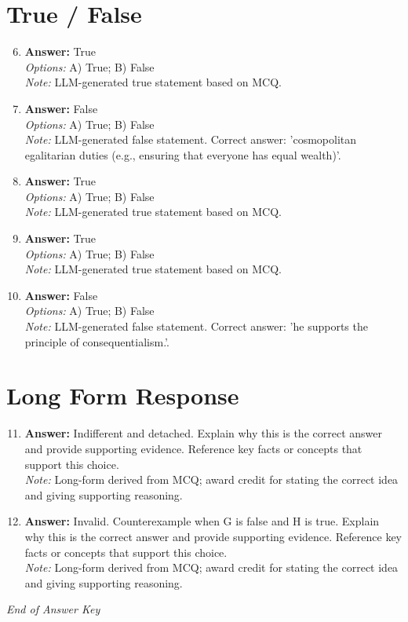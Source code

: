 \documentclass[12pt]{article}
\begin{document}
\section*{True / False}
\begin{enumerate}[label=\arabic*.]
\setcounter{enumi}{5}
\item \textbf{Answer:} True
\\ \textit{Options:} A) True; B) False
\\ \textit{Note:} LLM-generated true statement based on MCQ.
\item \textbf{Answer:} False
\\ \textit{Options:} A) True; B) False
\\ \textit{Note:} LLM-generated false statement. Correct answer: 'cosmopolitan egalitarian duties (e.g., ensuring that everyone has equal wealth)'.
\item \textbf{Answer:} True
\\ \textit{Options:} A) True; B) False
\\ \textit{Note:} LLM-generated true statement based on MCQ.
\item \textbf{Answer:} True
\\ \textit{Options:} A) True; B) False
\\ \textit{Note:} LLM-generated true statement based on MCQ.
\item \textbf{Answer:} False
\\ \textit{Options:} A) True; B) False
\\ \textit{Note:} LLM-generated false statement. Correct answer: 'he supports the principle of consequentialism.'.
\end{enumerate}

\section*{Long Form Response}
\begin{enumerate}[label=\arabic*.]
\setcounter{enumi}{10}
\item \textbf{Answer:} Indifferent and detached. Explain why this is the correct answer and provide supporting evidence. Reference key facts or concepts that support this choice.
\\ \textit{Note:} Long-form derived from MCQ; award credit for stating the correct idea and giving supporting reasoning.
\item \textbf{Answer:} Invalid. Counterexample when G is false and H is true. Explain why this is the correct answer and provide supporting evidence. Reference key facts or concepts that support this choice.
\\ \textit{Note:} Long-form derived from MCQ; award credit for stating the correct idea and giving supporting reasoning.
\end{enumerate}

\vfill
\noindent\textit{End of Answer Key}
\end{document}
